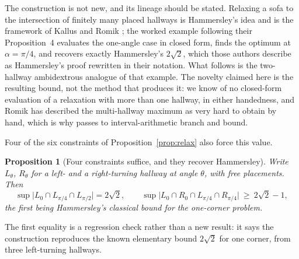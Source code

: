 \documentclass[11pt]{article}
\newtheorem{proposition}[theorem]{Proposition}
\theoremstyle{definition}
\begin{document}
The construction is not new, and its lineage should be stated. Relaxing a sofa to the
intersection of finitely many placed hallways is Hammersley's idea \cite{Ham68} and is the
framework of Kallus and Romik \cite{KR18}; the worked example following their Proposition~4
evaluates the one-angle case in closed form, finds the optimum at $\alpha=\pi/4$, and
recovers exactly Hammersley's $2\sqrt2$, which those authors describe as Hammersley's proof
rewritten in their notation. What follows is the two-hallway ambidextrous analogue of that
example. The novelty claimed here is the resulting bound, not the method that produces it:
we know of no closed-form evaluation of a relaxation with more than one hallway, in either
handedness, and Romik has described the multi-hallway maximum as very hard to obtain by
hand, which is why \cite{KR18} passes to interval-arithmetic branch and bound.

Four of the six constraints of Proposition~\ref{prop:relax} also force this value.

\begin{proposition}[Four constraints suffice, and they recover Hammersley]\label{prop:ham}
Write $L_\theta$, $R_\theta$ for a left- and a right-turning hallway at angle $\theta$,
with free placements. Then
\[
  \sup\bigl|L_0\cap L_{\pi/4}\cap L_{\pi/2}\bigr|=2\sqrt2,\qquad
  \sup\bigl|L_0\cap R_0\cap L_{\pi/4}\cap R_{\pi/4}\bigr|\ \ge\ 2\sqrt2-1 ,
\]
the first being Hammersley's classical bound for the one-corner problem.
\end{proposition}

The first equality is a regression check rather than a new result: it says the construction
reproduces the known elementary bound $2\sqrt2$ for one corner, from three left-turning
hallways.
\end{document}
